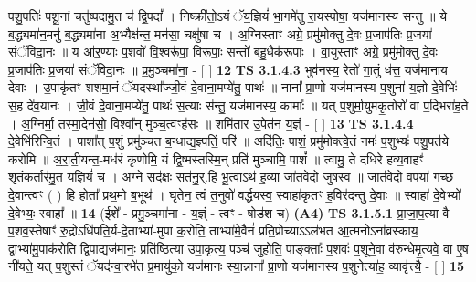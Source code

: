 \documentclass[17pt]{extarticle}
\begin{document}
                  पशु॒पतिः॑ पशू॒नां चतु॑ष्पदामु॒त च॑ द्वि॒पदां᳚ । निष्क्री॑तो॒ऽयं ॅय॒ज्ञियं॑ भा॒गमे॑तु रा॒यस्पोषा॒ यज॑मानस्य सन्तु ॥ ये ब॒द्ध्यमा॑न॒मनु॑ ब॒द्ध्यमा॑ना अ॒भ्यैक्ष॑न्त॒ मन॑सा॒ चक्षु॑षा च । अ॒ग्निस्ताꣳ अग्रे॒ प्रमु॑मोक्तु दे॒वः प्र॒जाप॑तिः प्र॒जया॑ संॅविदा॒नः ॥ य आ॑र॒ण्याः प॒शवो॑ वि॒श्वरू॑पा॒ विरू॑पाः॒ सन्तो॑ बहु॒धैक॑रूपाः । वा॒युस्ताꣳ अग्रे॒ प्रमु॑मोक्तु दे॒वः प्र॒जाप॑तिः प्र॒जया॑ संॅविदा॒नः ॥ प्र॒मु॒ञ्चमा॑ना॒ - [  ] \textbf{  12} \newline
                  \newline
                                \textbf{ TS 3.1.4.3} \newline
                  भुव॑नस्य॒ रेतो॑ गा॒तुं ध॑त्त॒ यज॑मानाय देवाः । उ॒पाकृ॑तꣳ शशमा॒नं ॅयदस्था᳚ज्जी॒वं दे॒वाना॒मप्ये॑तु॒ पाथः॑ ॥ नाना᳚ प्रा॒णो यज॑मानस्य प॒शुना॑ य॒ज्ञो दे॒वेभिः॑ स॒ह दे॑व॒यानः॑ । जी॒वं दे॒वाना॒मप्ये॑तु॒ पाथः॑ स॒त्याः स॑न्तु॒ यज॑मानस्य॒ कामाः᳚ ॥ यत् प॒शुर्मा॒युमकृ॒तोरो॑ वा प॒द्भिरा॑ह॒ते । अ॒ग्निर्मा॒ तस्मा॒देन॑सो॒ विश्वा᳚न् मुञ्च॒त्वꣳह॑सः ॥ शमि॑तार उ॒पेत॑न य॒ज्ञ्ं - [  ] \textbf{  13} \newline
                  \newline
                                \textbf{ TS 3.1.4.4} \newline
                  दे॒वेभि॑रिन्वि॒तं । पाशा᳚त् प॒शुं प्रमु॑ञ्चत ब॒न्धाद्य॒ज्ञ्प॑तिं॒ परि॑ ॥ अदि॑तिः॒ पाशं॒ प्रमु॑मोक्त्वे॒तं नमः॑ प॒शुभ्यः॑ पशु॒पत॑ये करोमि ॥ अ॒रा॒ती॒यन्त॒-मध॑रं कृणोमि॒ यं द्वि॒ष्मस्तस्मि॒न् प्रति॑ मुञ्चामि॒ पाशं᳚ ॥ त्वामु॒ ते द॑धिरे हव्य॒वाहꣳ॑ शृतंक॒र्तार॑मु॒त य॒ज्ञियं॑ च । अग्ने॒ सद॑क्षः॒ सत॑नु॒र्॒.हि भू॒त्वाऽथ॑ ह॒व्या जा॑तवेदो जुषस्व ॥ जात॑वेदो व॒पया॑ गच्छ दे॒वान्त्वꣳ ( ) हि होता᳚ प्रथ॒मो ब॒भूथ॑ । घृ॒तेन॒ त्वं त॒नुवो॑ वर्द्धयस्व॒ स्वाहा॑कृतꣳ ह॒विर॑दन्तु दे॒वाः ॥ स्वाहा॑ दे॒वेभ्यो॑ दे॒वेभ्यः॒ स्वाहा᳚ ॥ \textbf{  14} \newline
                  \newline
                      (ईशे᳚ - प्रमु॒ञ्चमा॑ना - य॒ज्ञ्ं - त्वꣳ - षोड॑श च)  \textbf{(A4)} \newline \newline
                                        \textbf{ TS 3.1.5.1} \newline
                  प्रा॒जा॒प॒त्या वै प॒शव॒स्तेषाꣳ॑ रु॒द्रोऽधि॑पति॒र्य-दे॒ताभ्या॑-मुपा क॒रोति॒ ताभ्या॑मे॒वैनं॑ प्रति॒प्रोच्याऽऽल॑भत आ॒त्मनोऽना᳚व्रस्काय॒ द्वाभ्या॑मु॒पाक॑रोति द्वि॒पाद्यज॑मानः॒ प्रति॑ष्ठित्या उपा॒कृत्य॒ पञ्च॑ जुहोति॒ पाङ्क्ताः᳚ प॒शवः॑ प॒शूने॒वा व॑रुन्धेमृ॒त्यवे॒ वा ए॒ष नी॑यते॒ यत् प॒शुस्तं ॅयद॑न्वा॒रभे॑त प्र॒मायु॑को॒ यज॑मानः स्या॒न्नाना᳚ प्रा॒णो यज॑मानस्य प॒शुनेत्या॑ह॒ व्यावृ॑त्त्यै॒ - [  ] \textbf{  15} \newline
\end{document}
